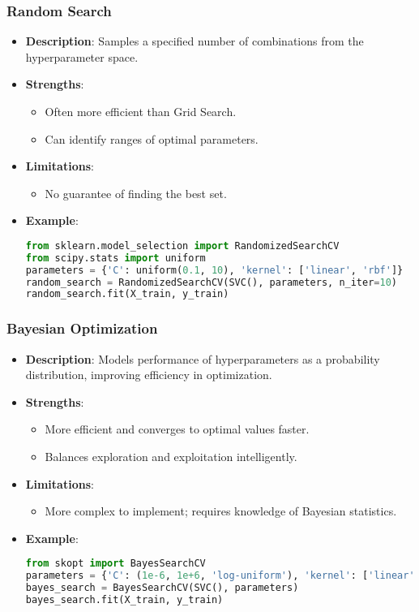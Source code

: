 \documentclass{beamer}
\begin{document}
\begin{frame}[fragile]
    \frametitle{Random Search}
    \begin{itemize}
        \item \textbf{Description}: Samples a specified number of combinations from the hyperparameter space.
        \item \textbf{Strengths}:
        \begin{itemize}
            \item Often more efficient than Grid Search.
            \item Can identify ranges of optimal parameters.
        \end{itemize}
        \item \textbf{Limitations}:
        \begin{itemize}
            \item No guarantee of finding the best set.
        \end{itemize}
        \item \textbf{Example}:
        \begin{lstlisting}[language=Python]
from sklearn.model_selection import RandomizedSearchCV
from scipy.stats import uniform
parameters = {'C': uniform(0.1, 10), 'kernel': ['linear', 'rbf']}
random_search = RandomizedSearchCV(SVC(), parameters, n_iter=10)
random_search.fit(X_train, y_train)
        \end{lstlisting}
    \end{itemize}
\end{frame}

\begin{frame}[fragile]
    \frametitle{Bayesian Optimization}
    \begin{itemize}
        \item \textbf{Description}: Models performance of hyperparameters as a probability distribution, improving efficiency in optimization.
        \item \textbf{Strengths}:
        \begin{itemize}
            \item More efficient and converges to optimal values faster.
            \item Balances exploration and exploitation intelligently.
        \end{itemize}
        \item \textbf{Limitations}:
        \begin{itemize}
            \item More complex to implement; requires knowledge of Bayesian statistics.
        \end{itemize}
        \item \textbf{Example}:
        \begin{lstlisting}[language=Python]
from skopt import BayesSearchCV
parameters = {'C': (1e-6, 1e+6, 'log-uniform'), 'kernel': ['linear', 'rbf']}
bayes_search = BayesSearchCV(SVC(), parameters)
bayes_search.fit(X_train, y_train)
        \end{lstlisting}
    \end{itemize}
\end{frame}
\end{document}
